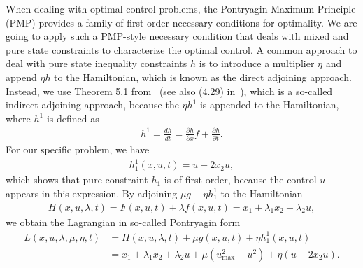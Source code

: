 \documentclass[a4paper]{article}
\theoremstyle{definition}
\theoremstyle{plain}
\begin{document}
When dealing with optimal control problems, the Pontryagin Maximum Principle (PMP) provides a
family of first-order necessary conditions for optimality. We are going to apply
such a PMP-style necessary condition that deals with mixed and pure state
constraints to characterize the optimal control.
%
A common approach to deal with pure state inequality constraints $h$ is to
introduce a multiplier $\eta$ and append $\eta h$ to the Hamiltonian, which is
known as the direct adjoining approach. Instead, we use Theorem 5.1
from~\cite{hartlSurveyMaximumPrinciples1995} (see also (4.29)
in~\cite{sethiOptimalControlTheory2019}), which is a so-called indirect
adjoining approach, because the $\eta h^{1}$ is appended to the Hamiltonian,
where $h^{1}$ is defined as
\begin{align*}
  h^{1} = \frac{dh}{dt} = \frac{\partial h}{\partial x}f + \frac{\partial h}{\partial t} .
\end{align*}
For our specific problem, we have
\begin{align*}
  h_{1}^{1}(x, u, t) = u - 2x_{2} u ,
\end{align*}
which shows that pure constraint $h_{1}$ is of first-order, because the control
$u$ appears in this expression.
%
By adjoining $\mu g + \eta h_{1}^{1}$ to the Hamiltonian
\begin{align*}
  H(x, u, \lambda, t) = F(x,u,t) + \lambda f(x,u,t) = x_{1} + \lambda_{1}x_{2} + \lambda_{2}u ,
\end{align*}
we obtain the Lagrangian in so-called Pontryagin form
\begin{align*}
  L(x, u, \lambda, \mu, \eta, t) &= H(x, u, \lambda, t) + \mu g(x, u, t) + \eta h_{1}^{1}(x, u, t) \\
  &= x_{1}  + \lambda_{1}x_{2} + \lambda_{2}u + \mu(u_{\max}^{2} - u^{2}) + \eta(u - 2x_{2}u) .
\end{align*}
\end{document}
